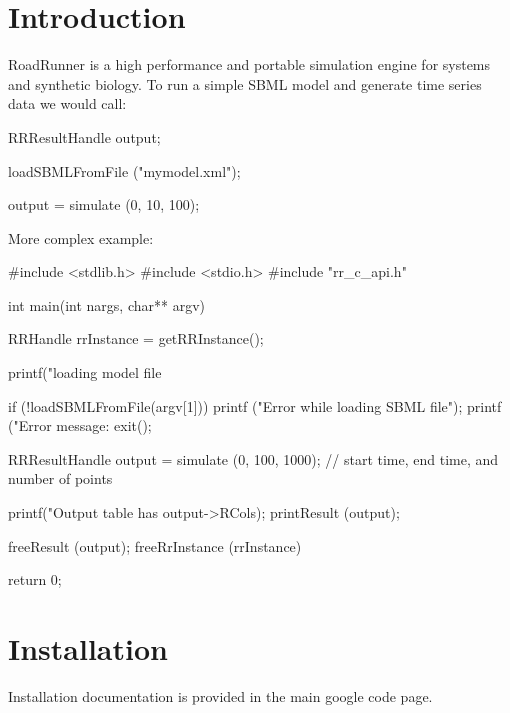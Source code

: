 \hypertarget{index_intro_sec}{}\section{\-Introduction}\label{index_intro_sec}
\-Road\-Runner is a high performance and portable simulation engine for systems and synthetic biology. \-To run a simple \-S\-B\-M\-L model and generate time series data we would call\-:


\begin{DoxyCode}
 RRResultHandle output;

 loadSBMLFromFile ("mymodel.xml");

 output = simulate (0, 10, 100);
\end{DoxyCode}


\-More complex example\-:


\begin{DoxyCode}
 #include <stdlib.h>
 #include <stdio.h>
 #include "rr_c_api.h"

 int main(int nargs, char** argv)
 {
        RRHandle rrInstance = getRRInstance();

        printf("loading model file %
 
        if (!loadSBMLFromFile(argv[1])) {
           printf ("Error while loading SBML file\n");
           printf ("Error message: %
           exit();
        }
                   
        RRResultHandle output = simulate (0, 100, 1000);  // start time, end
       time, and number of points
        
        printf("Output table has %
      output->RCols);
        printResult (output);
        
        freeResult (output);
        freeRrInstance (rrInstance)

        return 0;
 }
\end{DoxyCode}
 \hypertarget{index_install_sec}{}\section{\-Installation}\label{index_install_sec}
\-Installation documentation is provided in the main google code page. 
